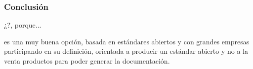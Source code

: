 \subsubsection{Conclusión}

¿?, porque...

 es una muy buena opción, basada en estándares abiertos y con grandes empresas participando en su definición, orientada a producir un estándar abierto y no a la venta productos para poder generar la documentación.
